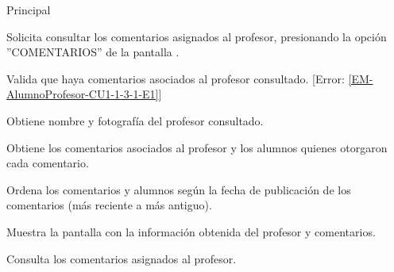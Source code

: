 \begin{UCtrayectoria}{Principal}

	\UCpaso [\UCactor] Solicita consultar los comentarios asignados al profesor, presionando la opción ''COMENTARIOS'' de la pantalla .

	\UCpaso Valida que haya comentarios asociados al profesor consultado. [Error: \ref{EM-AlumnoProfesor-CU1-1-3-1-E1}]

	\UCpaso Obtiene nombre y fotografía del profesor consultado. 

	\UCpaso Obtiene los comentarios asociados al profesor y los alumnos quienes otorgaron cada comentario. 

	\UCpaso Ordena los comentarios y alumnos según la fecha de publicación de los comentarios (más reciente a más antiguo).

	\UCpaso Muestra la pantalla  con la información obtenida del profesor y comentarios.

	\UCpaso[\UCactor] Consulta los comentarios asignados al profesor.

\end{UCtrayectoria}
		

